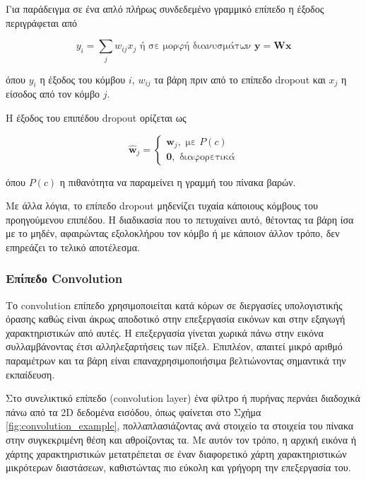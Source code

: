 	Για παράδειγμα σε ένα απλό πλήρως συνδεδεμένο γραμμικό επίπεδο η έξοδος περιγράφεται από
	
	\[ y_i = \sum_j w_{ij}x_j \text{ ή σε μορφή διανυσμάτων } \pmb{y} = \pmb{W}\pmb{x}\]
	
	όπου $y_i$ η έξοδος του κόμβου $i$, $w_{ij}$ τα βάρη πριν από το επίπεδο dropout και $x_j$ η είσοδος από τον κόμβο $j$.
	
	Η έξοδος του επιπέδου dropout ορίζεται ως
	
	\[ \pmb{\hat{w}}_j = 
		\begin{cases}
			\pmb{w}_j, \text{ με } P(c)\\
			\pmb{0}, \text{ διαφορετικά}
		\end{cases}	
	\]
	
	όπου $P(c)$ η πιθανότητα να παραμείνει η γραμμή του πίνακα βαρών. 
	
	Με άλλα λόγια, το επίπεδο dropout μηδενίζει τυχαία κάποιους κόμβους του προηγούμενου επιπέδου. Η διαδικασία που το πετυχαίνει αυτό, θέτοντας τα βάρη ίσα με το μηδέν, αφαιρώντας εξολοκλήρου τον κόμβο ή με κάποιον άλλον τρόπο, δεν επηρεάζει το τελικό αποτέλεσμα.
	
\subsubsection{Επίπεδο Convolution}
	\label{definition:convolution}

Το convolution επίπεδο χρησιμοποιείται κατά κόρων σε διεργασίες υπολογιστικής όρασης καθώς είναι άκρως αποδοτικό στην επεξεργασία εικόνων και στην εξαγωγή χαρακτηριστικών από αυτές. Η επεξεργασία γίνεται χωρικά πάνω στην εικόνα συλλαμβάνοντας έτσι αλληλεξαρτήσεις των πίξελ. Επιπλέον, απαιτεί μικρό αριθμό παραμέτρων και τα βάρη είναι επαναχρησιμοποιήσιμα βελτιώνοντας σημαντικά την εκπαίδευση.

Στο συνελικτικό επίπεδο (convolution layer) ένα φίλτρο ή πυρήνας περνάει διαδοχικά πάνω από τα 2D δεδομένα εισόδου, όπως φαίνεται στο Σχήμα \ref{fig:convolution_example}, πολλαπλασιάζοντας ανά στοιχείο τα στοιχεία του πίνακα στην συγκεκριμένη θέση και αθροίζοντας τα. Με αυτόν τον τρόπο, η αρχική εικόνα ή χάρτης χαρακτηριστικών μετατρέπεται σε έναν διαφορετικό χάρτη χαρακτηριστικών μικρότερων διαστάσεων, καθιστώντας πιο εύκολη και γρήγορη την επεξεργασία του.

